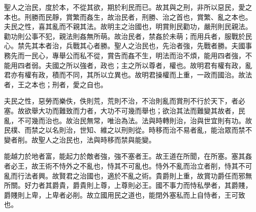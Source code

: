 
\begin{pinyinscope}
聖人之治民，度於本，不從其欲，期於利民而已。故其與之刑，非所以惡民，愛之本也。刑勝而民靜，賞繁而姦生，故治民者，刑勝、治之首也，賞繁、亂之本也。夫民之性，喜其亂而不親其法。故明主之治國也，明賞則民勸功，嚴刑則民親法。勸功則公事不犯，親法則姦無所萌。故治民者，禁姦於未萌；而用兵者，服戰於民心。禁先其本者治，兵戰其心者勝。聖人之治民也，先治者強，先戰者勝。夫國事務先而一民心，專舉公而私不從，賞告而姦不生，明法而治不煩，能用四者強，不能用四者弱。夫國之所以強者，政也；主之所以尊者，權也。故明君有權有政，亂君亦有權有政，積而不同，其所以立異也。故明君操權而上重，一政而國治。故法者，王之本也；刑者，愛之自也。

夫民之性，惡勞而樂佚，佚則荒，荒則不治，不治則亂而賞刑不行於天下，者必塞。故欲舉大功而難致而力者，大功不可幾而舉也；欲治其法而難變其故者，民亂，不可幾而治也。故治民無常，唯治為法。法與時轉則治，治與世宜則有功。故民樸、而禁之以名則治，世知、維之以刑則從。時移而治不易者亂，能治眾而禁不變者削。故聖人之治民也，法與時移而禁與能變。

能越力於地者富，能起力於敵者強，強不塞者王。故王道在所聞，在所塞。塞其姦者必王，故王術不恃外之不亂也，恃其不可亂也。恃外不亂而治立者削，恃其不可亂而行法者興。故賢君之治國也，適於不亂之術。貴爵則上重，故賞功爵任而邪無所關。好力者其爵貴，爵貴則上尊，上尊則必王。國不事力而恃私學者，其爵賤，爵賤則上卑，上卑者必削。故立國用民之道也，能閉外塞私而上自恃者，王可致也。


\end{pinyinscope}